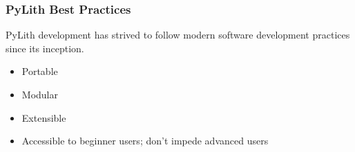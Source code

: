 \documentclass[aspectratio=169]{beamer}
\begin{document}
\begin{frame}
  \frametitle{PyLith Best Practices}
  \summary{}

  PyLith development has strived to follow modern software development practices since its inception.

  \vfill
  \begin{itemize}
  \item Portable
  \item Modular
  \item Extensible
  \item Accessible to beginner users; don't impede advanced users
  \end{itemize}

\end{frame}
\end{document}
